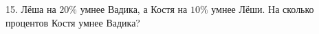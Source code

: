 15. Лёша на $20\%$ умнее Вадика, а Костя на $10\%$ умнее Лёши. На сколько процентов Костя умнее Вадика?\\
